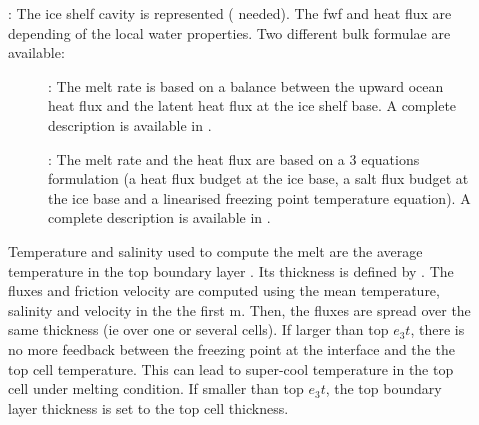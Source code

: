\documentclass[../main/NEMO_manual]{subfiles}
\begin{document}
\begin{description}
\item[]:
  The ice shelf cavity is represented ( needed).
  The fwf and heat flux are depending of the local water properties.
  Two different bulk formulae are available:

	\begin{description}
	\item[]:
     The melt rate is based on a balance between the upward ocean heat flux and
     the latent heat flux at the ice shelf base. A complete description is available in \citet{Hunter2006}.
	\item[]:
     The melt rate and the heat flux are based on a 3 equations formulation
     (a heat flux budget at the ice base, a salt flux budget at the ice base and a linearised freezing point temperature equation). 
     A complete description is available in \citet{Jenkins1991}.
	\end{description}

     Temperature and salinity used to compute the melt are the average temperature in the top boundary layer \citet{Losch2008}. 
     Its thickness is defined by .
     The fluxes and friction velocity are computed using the mean temperature, salinity and velocity in the the first  m.
     Then, the fluxes are spread over the same thickness (ie over one or several cells).
     If  larger than top $e_{3}t$, there is no more feedback between the freezing point at the interface and the the top cell temperature.
     This can lead to super-cool temperature in the top cell under melting condition.
     If  smaller than top $e_{3}t$, the top boundary layer thickness is set to the top cell thickness.\\


\end{description}
\end{document}
